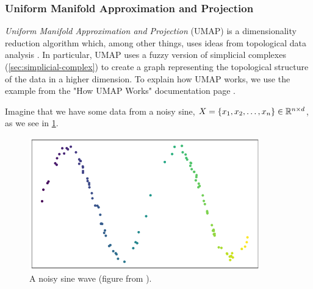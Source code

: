 \subsubsection{Uniform Manifold Approximation and Projection}
\label{sec:umap}
\textit{Uniform Manifold Approximation and Projection} (UMAP) is a dimensionality reduction algorithm which, among other things, uses ideas from topological data analysis \cite{2018arXivUMAP}. In particular, UMAP uses a fuzzy version of simplicial complexes (\cref{sec:simplicial-complex}) to create a graph representing the topological structure of the data in a higher dimension. To explain how UMAP works, we use the example from the "How UMAP Works" documentation page \cite{how-umap-works-2018}.

Imagine that we have some data from a noisy sine, $X = \left\{x_1, x_2, \ldots, x_n\right\} \in \mathbb{R}^{n \times d}$, as we see in \cref{fig:how_umap_works_raw_data}.
\begin{figure}[H]
    \centering
    \includegraphics[width=10cm]{thesis/figures/how_umap_works_raw_data.png}
    \caption{A noisy sine wave (figure from \cite{how-umap-works-2018}).}
    \label{fig:how_umap_works_raw_data}
\end{figure}

